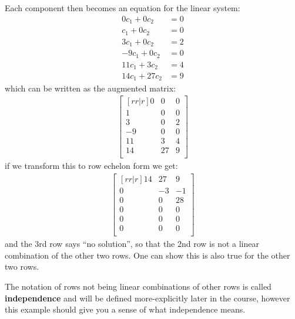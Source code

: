 Each component then becomes an equation for the linear system:
%
\begin{align*}
0 c_1 + 0 c_2 & = 0 \\
c_1 + 0 c_2 & = 0 \\
3 c_1 + 0 c_2 & = 2 \\
-9 c_1 + 0 c_2 & = 0 \\
11 c_1 + 3 c_2 & = 4 \\
14 c_1 + 27 c_2 & = 9 
\end{align*}
which can be written as the augmented matrix:
%
\begin{align*}
\begin{bmatrix}[rr|r]
0 & 0 & 0 \\
1 & 0 & 0 \\
3 & 0 & 2 \\
-9 & 0 & 0 \\
11 & 3 & 4 \\
14 & 27 & 9\\
\end{bmatrix} 
\end{align*}
if we transform this to row echelon form we get:
%
\begin{align*}
\begin{bmatrix}[rr|r]
14 & 27 & 9\\
0 & -3 & -1\\
0 & 0 & 28\\
0 & 0 & 0\\
0 & 0 & 0\\
0 & 0 & 0\\
\end{bmatrix}
\end{align*}
and the 3rd row says ``no solution'', so that the 2nd row is not a linear combination of the other two rows.  One can show this is also true for the other two rows.  

The notation of rows not being linear combinations of other rows is called \textbf{independence} and will be defined more-explicitly later in the course, however this example should give you a sense of what independence means.  

